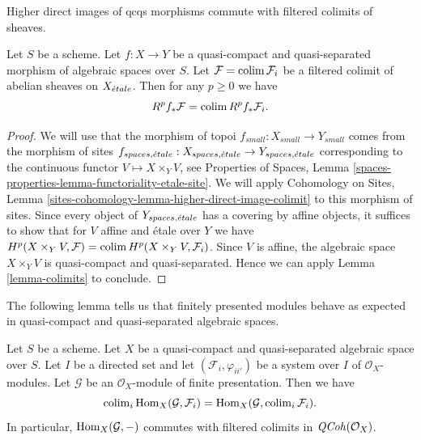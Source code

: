 \begin{lemma}
\label{lemma-colimit-cohomology}
\begin{slogan}
Higher direct images of qcqs morphisms commute with filtered colimits
of sheaves.
\end{slogan}
Let $S$ be a scheme. Let $f : X \to Y$ be a quasi-compact and quasi-separated
morphism of algebraic spaces over $S$. Let $\mathcal{F} = \mathop{\mathrm{colim}}\nolimits \mathcal{F}_i$
be a filtered colimit of abelian sheaves on $X_{\acute{e}tale}$.
Then for any $p \geq 0$ we have
$$
R^pf_*\mathcal{F} = \mathop{\mathrm{colim}}\nolimits R^pf_*\mathcal{F}_i.
$$
\end{lemma}

\begin{proof}
We will use that the morphism of topoi $f_{small} : X_{small} \to Y_{small}$
comes from the morphism of sites
$f_{spaces, {\acute{e}tale}} : X_{spaces, {\acute{e}tale}} \to Y_{spaces, {\acute{e}tale}}$
corresponding to the continuous functor $V \longmapsto X \times_Y V$,
see Properties of Spaces, Lemma
\ref{spaces-properties-lemma-functoriality-etale-site}.
We will apply Cohomology on Sites, Lemma
\ref{sites-cohomology-lemma-higher-direct-image-colimit}
to this morphism of sites. Since every object of $Y_{spaces, {\acute{e}tale}}$
has a covering by affine objects, it suffices to show that
for $V$ affine and \'etale over $Y$ we have
$H^p(X \times_Y V, \mathcal{F}) = \mathop{\mathrm{colim}}\nolimits H^p(X \times_Y V, \mathcal{F}_i)$.
Since $V$ is affine, the algebraic space $X \times_Y V$ is
quasi-compact and quasi-separated.
Hence we can apply Lemma \ref{lemma-colimits}
to conclude.
\end{proof}

\noindent
The following lemma tells us that finitely presented modules behave
as expected in quasi-compact and quasi-separated algebraic spaces.

\begin{lemma}
\label{lemma-finite-presentation-quasi-compact-colimit}
Let $S$ be a scheme. Let $X$ be a quasi-compact and quasi-separated
algebraic space over $S$. Let $I$ be a directed set and
let $(\mathcal{F}_i, \varphi_{ii'})$ be a system over $I$
of $\mathcal{O}_X$-modules. Let $\mathcal{G}$ be an
$\mathcal{O}_X$-module of finite presentation. Then we have
$$
\mathop{\mathrm{colim}}\nolimits_i \mathop{\mathrm{Hom}}\nolimits_X(\mathcal{G}, \mathcal{F}_i)
=
\mathop{\mathrm{Hom}}\nolimits_X(\mathcal{G}, \mathop{\mathrm{colim}}\nolimits_i \mathcal{F}_i).
$$
In particular, $\mathop{\mathrm{Hom}}\nolimits_X(\mathcal{G}, -)$ commutes with filtered
colimits in $\mathit{QCoh}(\mathcal{O}_X)$.
\end{lemma}

